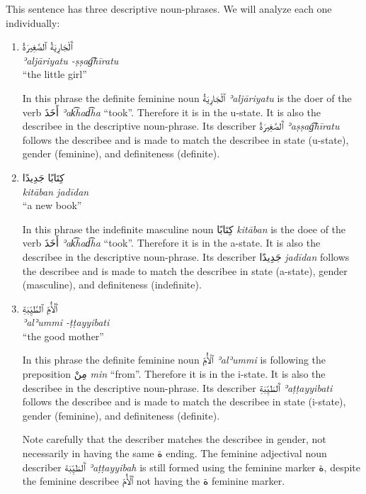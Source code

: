 \documentclass[
  10pt,
]{book}
\begin{document}
This sentence has three descriptive noun-phrases. We will analyze each one individually:

\begin{enumerate}
\def\labelenumi{\roman{enumi}.}
\item
  \foreignlanguage{arabic}{ٱَلْجَارِيَةُ ٱلصَّغِيرَةُ}\\
  \emph{ʾaljāriyatu -ṣṣag͡hīratu}\\
  \enquote{the little girl}

  In this phrase the definite feminine noun \foreignlanguage{arabic}{ٱلْجَارِيَةُ} \emph{ʾaljāriyatu} is the doer of the verb \foreignlanguage{arabic}{أَخَذَ} \emph{ʾak͡had͡ha} \enquote{took}. Therefore it is in the u-state. It is also the describee in the descriptive noun-phrase. Its describer \foreignlanguage{arabic}{ٱَلصَّغِيرَةُ} \emph{ʾaṣṣag͡hīratu} follows the describee and is made to match the describee in state (u-state), gender (feminine), and definiteness (definite).
\item
  \foreignlanguage{arabic}{کِتَابًا جَدِيدًا}\\
  \emph{kitāban jadīdan}\\
  \enquote{a new book}

  In this phrase the indefinite masculine noun \foreignlanguage{arabic}{کِتَابًا} \emph{kitāban} is the doee of the verb \foreignlanguage{arabic}{أَخَذَ} \emph{ʾak͡had͡ha} \enquote{took}. Therefore it is in the a-state. It is also the describee in the descriptive noun-phrase. Its describer \foreignlanguage{arabic}{جَدِيدًا} \emph{jadīdan} follows the describee and is made to match the describee in state (a-state), gender (masculine), and definiteness (indefinite).
\item
  \foreignlanguage{arabic}{ٱَلْأُمِّ ٱلطَّيِّبَةِ}\\
  \emph{ʾalʾummi -ṭṭayyibati}\\
  \enquote{the good mother}

  In this phrase the definite feminine noun \foreignlanguage{arabic}{ٱلْأُمِّ} \emph{ʾalʾummi} is following the preposition \foreignlanguage{arabic}{مِنْ} \emph{min} \enquote{from}. Therefore it is in the i-state. It is also the describee in the descriptive noun-phrase. Its describer \foreignlanguage{arabic}{ٱَلطَيِّبَةِ} \emph{ʾaṭṭayyibati} follows the describee and is made to match the describee in state (i-state), gender (feminine), and definiteness (definite).

  Note carefully that the describer matches the describee in gender, not necessarily in having the same \foreignlanguage{arabic}{ة} ending. The feminine adjectival noun describer \foreignlanguage{arabic}{ٱَلطَيِّبَة} \emph{ʾaṭṭayyibah} is still formed using the feminine marker \foreignlanguage{arabic}{ة}, despite the feminine describee \foreignlanguage{arabic}{ٱَلْأُمّ} not having the \foreignlanguage{arabic}{ة} feminine marker.
\end{enumerate}
\end{document}
